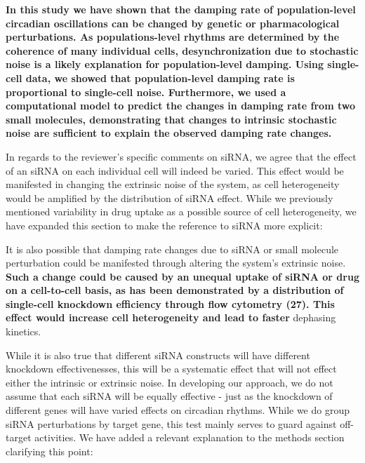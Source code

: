 \documentclass[11pt, letterpaper]{article}
\newenvironment{manuscript}[1]{\begin{center}\begin{tcolorbox}[colback=green!5!white,colframe=green!75!black,width=\textwidth,title={#1},breakable,fonttitle=\bfseries]}{\end{tcolorbox}\end{center}}
\begin{document}
\begin{manuscript}{Page 7}
  {\bfseries In this study we have shown that the damping rate of population-level circadian oscillations can be changed by genetic or pharmacological perturbations.
As populations-level rhythms are determined by the coherence of many individual cells, desynchronization due to stochastic noise is a likely explanation for population-level damping.
Using single-cell data, we showed that population-level damping rate is proportional to single-cell noise.
Furthermore, we used a computational model to predict the changes in damping rate from two small molecules, demonstrating that changes to intrinsic stochastic noise are sufficient to explain the observed damping rate changes.}
\end{manuscript}

In regards to the reviewer's specific comments on siRNA, we agree that the effect of an siRNA on each individual cell will indeed be varied.
This effect would be manifested in changing the extrinsic noise of the system, as cell heterogeneity would be amplified by the distribution of siRNA effect.
While we previously mentioned variability in drug uptake as a possible source of cell heterogeneity, we have expanded this section to make the reference to siRNA more explicit:

\begin{manuscript}{Pages 6-7}
It is also possible that damping rate changes due to siRNA or small molecule perturbation could be manifested through altering the system's extrinsic noise. 
{\bfseries Such a change could be caused by an unequal uptake of siRNA or drug on a cell-to-cell basis, as has been demonstrated by a distribution of single-cell knockdown efficiency through flow cytometry (27). 
This effect would increase cell heterogeneity and lead to faster} dephasing kinetics.
\end{manuscript}

While it is also true that different siRNA constructs will have different knockdown effectivenesses, this will be a systematic effect that will not effect either the intrinsic or extrinsic noise.
In developing our approach, we do not assume that each siRNA will be equally effective - just as the knockdown of different genes will have varied effects on circadian rhythms.
While we do group siRNA perturbations by target gene, this test mainly serves to guard against off-target activities.
We have added a relevant explanation to the methods section clarifying this point:
\end{document}
